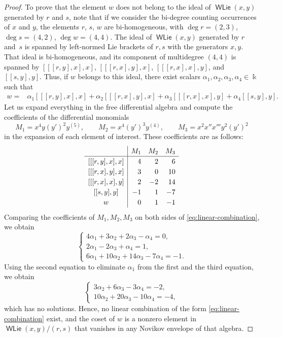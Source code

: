 \documentclass[11pt,reqno]{amsart}
\theoremstyle{plain}
\theoremstyle{definition}
\theoremstyle{remark}
\newcommand{\bk}{\Bbbk}
\DeclareMathOperator{\WLie}{\mathsf{WLie}}
\begin{document}
\begin{proof}
To prove that the element $w$ does not belong to the ideal of $\WLie(x,y)$ generated by $r$ and $s$, note that if we consider the bi-degree counting occurrences of $x$ and $y$, the elements $r$, $s$, $w$ are bi-homogeneous, with $\deg r=(2,3)$, $\deg s=(4,2)$, $\deg w=(4,4)$. 
The ideal of $\WLie(x,y)$ generated by $r$ and~$s$ is spanned by left-normed Lie brackets of $r,s$  with the generators $x,y$. That ideal is bi-homogeneous, and its component of multidegree $(4,4)$ is spanned by
$[[[r,y],x],x]$, $[[[r,x],y],x]$, $[[[r,x],x],y]$, and $[[s,y],y]$.
Thus, if $w$ belongs to this ideal, there exist scalars $\alpha_1,\alpha_2,\alpha_3,\alpha_4\in \bk$ such that
\begin{equation}\label{eq:linear-combination}
\begin{aligned}
 w=&\alpha_1[[[r,y],x],x]+\alpha_2[[[r,x],y],x]+\alpha_3[[[r,x],x],y]+\alpha_4[[s,y],y].
\end{aligned}
\end{equation}
Let us expand everything in the free differential algebra and compute the coefficients of the differential monomials 
\[
M_1=x^4y(y')^2y^{(5)},\qquad
M_2=x^4(y')^3y^{(4)}, \qquad
M_3=x^2x''x'''y^2(y')^2
\]
in the expansion of each element of interest. These coefficients are as follows:
\[
\renewcommand{\arraystretch}{1.2}
\begin{array}{c|rrr}
 &M_1&M_2&M_3\\ \hline
 \relax [[[r,y],x],x]&4&2&6\\
 \relax [[[r,x],y],x]&3&0&10\\
 \relax [[[r,x],x],y]&2&-2&14\\
 \relax [[s,y],y]&-1&1&-7\\
 w&0&1&-1
\end{array}
\]
Comparing the coefficients of $M_1,M_2,M_3$ on both sides of \eqref{eq:linear-combination}, we obtain
 \[
\begin{cases}
4\alpha_1+3\alpha_2+2\alpha_3-\alpha_4=0,\\
2\alpha_1-2\alpha_3+\alpha_4=1,\\
6\alpha_1+10\alpha_2+14\alpha_3-7\alpha_4=-1.
\end{cases}
 \]
Using the second equation to eliminate $\alpha_1$ from the first and the third equation, we obtain 
 \[
\begin{cases}
3\alpha_2+6\alpha_3-3\alpha_4=-2,\\
10\alpha_2+20\alpha_3-10\alpha_4=-4,
\end{cases}
 \]
which has no solutions. Hence, no linear combination of the form \eqref{eq:linear-combination} exist, and the coset of $w$ is a nonzero element in $\WLie(x,y)/(r,s)$ that vanishes in any Novikov envelope of that algebra.
\end{proof}
\end{document}
